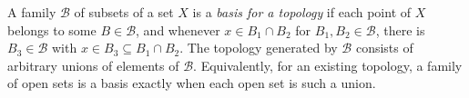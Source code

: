 
A family $\mathcal B$ of subsets of a set $X$ is a \emph{basis for a topology} if each point of $X$ belongs to some $B\in\mathcal B$, and whenever $x\in B_1\cap B_2$ for $B_1,B_2\in\mathcal B$, there is $B_3\in\mathcal B$ with $x\in B_3\subseteq B_1\cap B_2$. The topology generated by $\mathcal B$ consists of arbitrary unions of elements of $\mathcal B$. Equivalently, for an existing topology, a family of open sets is a basis exactly when each open set is such a union.
